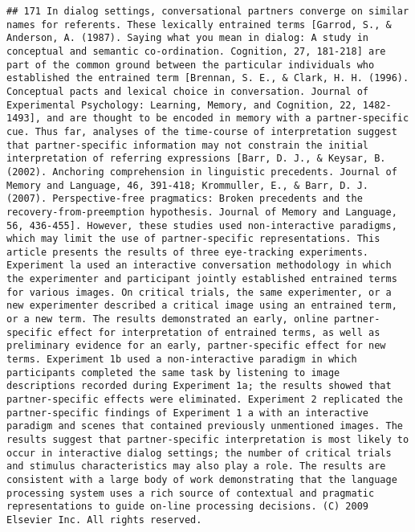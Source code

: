 \documentclass[
  english,
  man]{apa6}
\begin{document}
\begin{verbatim}
## 171 In dialog settings, conversational partners converge on similar names for referents. These lexically entrained terms [Garrod, S., & Anderson, A. (1987). Saying what you mean in dialog: A study in conceptual and semantic co-ordination. Cognition, 27, 181-218] are part of the common ground between the particular individuals who established the entrained term [Brennan, S. E., & Clark, H. H. (1996). Conceptual pacts and lexical choice in conversation. Journal of Experimental Psychology: Learning, Memory, and Cognition, 22, 1482-1493], and are thought to be encoded in memory with a partner-specific cue. Thus far, analyses of the time-course of interpretation suggest that partner-specific information may not constrain the initial interpretation of referring expressions [Barr, D. J., & Keysar, B. (2002). Anchoring comprehension in linguistic precedents. Journal of Memory and Language, 46, 391-418; Krommuller, E., & Barr, D. J. (2007). Perspective-free pragmatics: Broken precedents and the recovery-from-preemption hypothesis. Journal of Memory and Language, 56, 436-455]. However, these studies used non-interactive paradigms, which may limit the use of partner-specific representations. This article presents the results of three eye-tracking experiments. Experiment la used an interactive conversation methodology in which the experimenter and participant jointly established entrained terms for various images. On critical trials, the same experimenter, or a new experimenter described a critical image using an entrained term, or a new term. The results demonstrated an early, online partner-specific effect for interpretation of entrained terms, as well as preliminary evidence for an early, partner-specific effect for new terms. Experiment 1b used a non-interactive paradigm in which participants completed the same task by listening to image descriptions recorded during Experiment 1a; the results showed that partner-specific effects were eliminated. Experiment 2 replicated the partner-specific findings of Experiment 1 a with an interactive paradigm and scenes that contained previously unmentioned images. The results suggest that partner-specific interpretation is most likely to occur in interactive dialog settings; the number of critical trials and stimulus characteristics may also play a role. The results are consistent with a large body of work demonstrating that the language processing system uses a rich source of contextual and pragmatic representations to guide on-line processing decisions. (C) 2009 Elsevier Inc. All rights reserved.

\end{verbatim}
\end{document}
